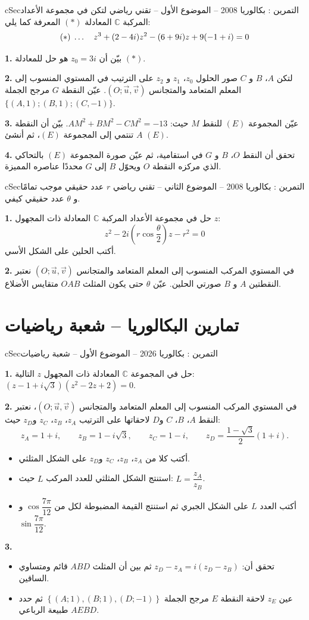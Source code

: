 \documentclass[12pt,a4paper]{article}
\newenvironment{BOX}[2]{\begin{otherlanguage}{english}\begin{arbox}{#1}{#2}}{\end{arbox}\end{otherlanguage}}
\newcounter{exo}
\newenvironment{tamrin}[1]{\stepcounter{exo}\begin{BOX}{cSec}{التمرين \theexo: #1}}{\end{BOX}}
\renewcommand{\ldots}{\mathinner{\ldotp\ldotp\ldotp}}
\newenvironment{sq}{\begin{itemize}[leftmargin=2.4em,itemsep=3pt]}{\end{itemize}}
\newcommand{\qa}{\item[(أ)]}\newcommand{\qb}{\item[(ب)]}\newcommand{\qc}{\item[(جـ)]}\newcommand{\qd}{\item[(د)]}\newcommand{\qe}{\item[(هـ)]}
\newcommand{\QQ}[1]{\par\smallskip\textbf{#1.} }
\begin{document}
\begin{tamrin}{بكالوريا 2008 -- الموضوع الأول -- تقني رياضي}
لتكن في مجموعة الأعداد المركبة $\mathbb{C}$ المعادلة $(*)$ المعرفة كما يلي:
\[(*)\;\ldots\quad z^3+(2-4i)z^2-(6+9i)z+9(-1+i)=0\]
\QQ{1} بيّن أن $z_0=3i$ هو حل للمعادلة $(*)$.
\QQ{2} لتكن $A$، $B$ و $C$ صور الحلول $z_0$، $z_1$ و $z_2$ على الترتيب في المستوي المنسوب إلى المعلم المتعامد والمتجانس $(O;\vec u,\vec v)$.
عيّن النقطة $G$ مرجح الجملة $\{(A,1);(B,1);(C,-1)\}$.
\QQ{3} عيّن المجموعة $(E)$ للنقط $M$ حيث: $AM^2+BM^2-CM^2=-13$.
بيّن أن النقطة $A$ تنتمي إلى المجموعة $(E)$، ثم أنشئ $(E)$.
\QQ{4} تحقق أن النقط $O$، $B$ و $G$ في استقامية، ثم عيّن صورة المجموعة $(E)$ بالتحاكي الذي مركزه النقطة $O$ ويحوّل $B$ إلى $G$ محددًا عناصره المميزة.
\end{tamrin}

\begin{tamrin}{بكالوريا 2008 -- الموضوع الثاني -- تقني رياضي}
$r$ عدد حقيقي موجب تمامًا و $\theta$ عدد حقيقي كيفي.
\QQ{1} حل في مجموعة الأعداد المركبة $\mathbb{C}$ المعادلة ذات المجهول $z$:
\[z^2-2i\left(r\cos\frac{\theta}{2}\right)z-r^2=0\]
أكتب الحلين على الشكل الأسي.
\QQ{2} في المستوي المركب المنسوب إلى المعلم المتعامد والمتجانس $(O;\vec u,\vec v)$ نعتبر النقطتين $A$ و $B$ صورتي الحلين.
عيّن $\theta$ حتى يكون المثلث $OAB$ متقايس الأضلاع.
\end{tamrin}

\section{تمارين البكالوريا -- شعبة رياضيات}
\begin{tamrin}{بكالوريا 2026 -- الموضوع الأول -- شعبة رياضيات}
\QQ{1} حل في المجموعة $\mathbb{C}$ المعادلة ذات المجهول $z$ التالية: $\left(z-1+i\sqrt3\right)\left(z^2-2z+2\right)=0$.

\QQ{2} في المستوي المركب المنسوب إلى المعلم المتعامد والمتجانس $\left(O;\vec u,\vec v\right)$، نعتبر النقط $A$، $B$، $C$ و$D$ لاحقاتها على الترتيب $z_A$، $z_B$، $z_C$ و$z_D$ حيث:
\[z_A=1+i,\qquad z_B=1-i\sqrt3,\qquad z_C=1-i,\qquad z_D=\frac{1-\sqrt3}{2}(1+i).\]
\begin{sq}
\qa أكتب كلا من $z_A$، $z_B$، $z_C$ و$z_D$ على الشكل المثلثي.
\qb استنتج الشكل المثلثي للعدد المركب $L$ حيث: $L=\dfrac{z_A}{z_B}$.
\qc أكتب العدد $L$ على الشكل الجبري ثم استنتج القيمة المضبوطة لكل من $\cos\dfrac{7\pi}{12}$ و$\sin\dfrac{7\pi}{12}$.
\end{sq}
\QQ{3}
\begin{sq}
\qa تحقق أن: $z_D-z_A=i\left(z_D-z_B\right)$ ثم بين أن المثلث $ABD$ قائم ومتساوي الساقين.
\qb عين $z_E$ لاحقة النقطة $E$ مرجح الجملة $\left\{(A;1),(B;1),(D;-1)\right\}$ ثم حدد طبيعة الرباعي $AEBD$.
\end{sq}
\end{tamrin}
\end{document}
